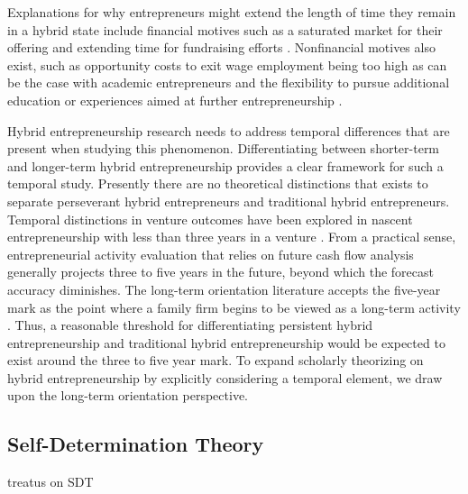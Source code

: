 \documentclass{article}
\begin{document}
Explanations for why entrepreneurs might extend the length of time they remain in a hybrid state include financial motives such as a saturated market for their offering \cite{gras2014risky} and extending time for fundraising efforts \cite{caliendo2020entrepreneurial}. Nonfinancial motives also exist, such as opportunity costs to exit wage employment being too high as can be the case with academic entrepreneurs \cite{hammarstrom2014pursuing, nicolaou2003academic,nicolaou2003social} and the flexibility to pursue additional education or experiences aimed at further entrepreneurship \cite{okolie2024longitudinal}.  

Hybrid entrepreneurship research needs to address temporal differences that are present when studying this phenomenon.  Differentiating between shorter-term and longer-term hybrid entrepreneurship provides a clear framework for such a temporal study.  Presently there are no theoretical distinctions that exists to separate perseverant hybrid entrepreneurs and traditional hybrid entrepreneurs. Temporal distinctions in venture outcomes have been explored in nascent entrepreneurship with less than three years in a venture \cite{lewis2024doing}.  From a practical sense, entrepreneurial activity evaluation that relies on future cash flow analysis generally projects three to five years in the future, beyond which the forecast accuracy diminishes.  The long-term orientation literature accepts the five-year mark as the point where a family firm begins to be viewed as a long-term activity \cite{lebreton2006why, lumpkin2011long}.  Thus, a reasonable threshold for differentiating persistent hybrid entrepreneurship and traditional hybrid entrepreneurship would be expected to exist around the three to five year mark.    To expand scholarly theorizing on hybrid entrepreneurship by explicitly considering a temporal element, we draw upon the long-term orientation perspective. 

\subsection{Self-Determination Theory}
treatus on SDT
\end{document}

